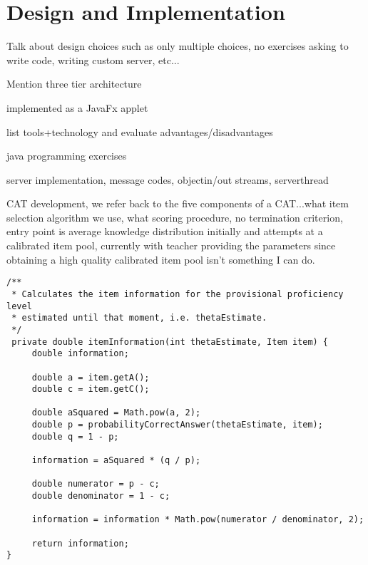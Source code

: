 \chapter{Design and Implementation}
\label{chap:implementation}
Talk about design choices such as only multiple choices, no exercises asking to write code, writing custom server, etc...

Mention three tier architecture

implemented as a JavaFx applet

list tools+technology and evaluate advantages/disadvantages

java programming exercises

server implementation, message codes, objectin/out streams, serverthread


CAT development, we refer back to the five components of a CAT...what item selection algorithm we use, what scoring procedure, no termination criterion, entry point is average knowledge distribution initially and attempts at a calibrated item pool, currently with teacher providing the parameters since obtaining a high quality calibrated item pool isn't something I can do.

\begin{lstlisting}
/**
 * Calculates the item information for the provisional proficiency level
 * estimated until that moment, i.e. thetaEstimate.
 */
 private double itemInformation(int thetaEstimate, Item item) {
     double information;

     double a = item.getA();
     double c = item.getC();

     double aSquared = Math.pow(a, 2);
     double p = probabilityCorrectAnswer(thetaEstimate, item);
     double q = 1 - p;

     information = aSquared * (q / p);

     double numerator = p - c;
     double denominator = 1 - c;

     information = information * Math.pow(numerator / denominator, 2);

     return information;
}
\end{lstlisting}
